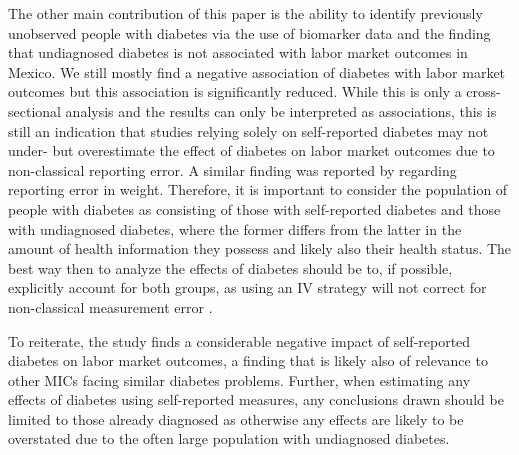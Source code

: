 \documentclass[12pt,english,british]{article}
\begin{document}
The other main contribution of this paper is the ability to identify previously unobserved people with diabetes via the use of biomarker data and the finding that undiagnosed
diabetes is not associated with labor market outcomes in Mexico. We still mostly find a negative association of diabetes with labor market outcomes but this association is significantly reduced. While this is only a cross-sectional analysis and the results can only be interpreted as associations, this is still an indication that studies relying solely on self-reported diabetes may not under- but overestimate the effect of diabetes on labor market outcomes due to non-classical reporting error. A similar finding was reported by \citet{Cawley2015} regarding reporting error in weight. Therefore, it is important to consider the population of people with diabetes as consisting of those with self-reported diabetes and those with undiagnosed diabetes, where the former differs from the latter in the amount of health information they possess and likely also their health status. The best way then to analyze the effects of diabetes should be to, if possible, explicitly account for both groups, as using an \ac{IV} strategy will not correct for non-classical measurement error \citep{Cawley2015}.

To reiterate, the study finds a considerable negative impact of self-reported diabetes on labor market outcomes, a finding that is likely also of relevance to other \ac{MICs} facing similar diabetes problems. Further, when estimating any effects of diabetes using self-reported measures, any conclusions drawn should be limited to those already diagnosed as otherwise any effects are likely to be overstated due to the often large population with undiagnosed diabetes.
\end{document}
